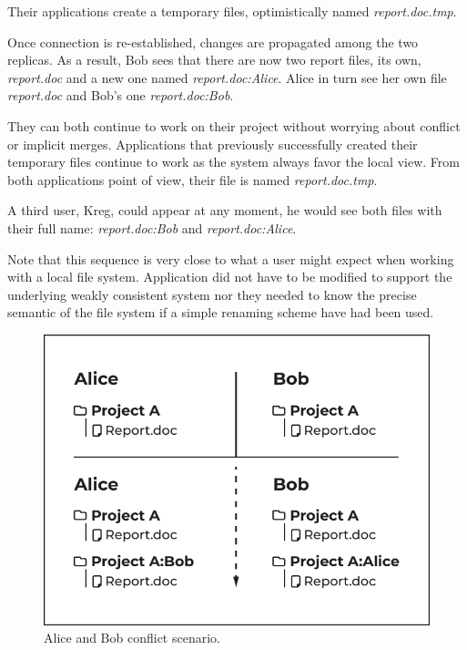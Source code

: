 \documentclass[sigconf, 10pt]{acmart}
\begin{document}
Their applications create a temporary files, optimistically named \textit{report.doc.tmp}.

Once connection is re-established, changes are propagated among the two replicas.
As a result, Bob sees that there are now two report files, its own, \textit{report.doc} and a new one named \textit{report.doc:Alice}.
Alice in turn see her own file \textit{report.doc} and Bob's one \textit{report.doc:Bob}.

They can both continue to work on their project without worrying about
conflict or implicit merges. Applications that previously successfully created their temporary files continue to work as the system always favor the local view. From both applications point of view, their file is named \textit{report.doc.tmp}.

A third user, Kreg, could appear at any moment, he would see both files with their full name: \textit{report.doc:Bob} and \textit{report.doc:Alice}.

Note that this sequence is very close to what a user might expect when working with a local file system. Application did not have to be modified to support the underlying weakly consistent system nor they needed to know the precise semantic of the file system if a simple renaming scheme have had been used.

\begin{figure}[h]
	\caption{Alice and Bob conflict scenario.}
	\centering
	\includegraphics[scale=0.5]{AliceBob-font-des-fichiers.pdf}
\end{figure}
\end{document}
